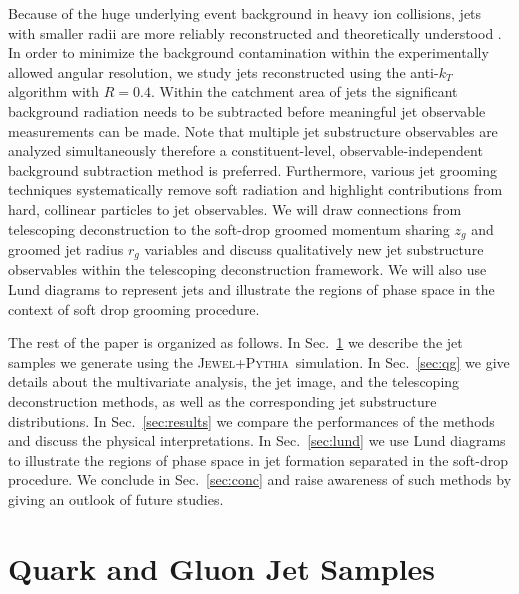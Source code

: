 \documentclass[notoc]{JHEP3}
\newcommand{\jwpy}{\textsc{Jewel+Pythia}~}
\begin{document}
Because of the huge underlying event background in heavy ion collisions, jets with smaller radii are more reliably reconstructed and theoretically understood \cite{Dasgupta:2014yra,Chien:2015cka,Becher:2015hka,Kang:2016mcy}. In order to minimize the background contamination within the experimentally allowed angular resolution, we study jets reconstructed using the anti-$k_T$ algorithm \cite{Cacciari:2008gp} with $R=0.4$. Within the catchment area of jets the significant background radiation needs to be subtracted before meaningful jet observable measurements can be made. Note that multiple jet substructure observables are analyzed simultaneously therefore a constituent-level, observable-independent background subtraction method \cite{Soyez:2012hv,Cacciari:2014gra,Berta:2014eza,Bertolini:2014bba,Komiske:2017ubm} is preferred. Furthermore, various jet grooming techniques \cite{Ellis:2009su,Ellis:2009me,Krohn:2009th,Dasgupta:2013ihk,Larkoski:2014wba} systematically remove soft radiation and highlight contributions from hard, collinear particles to jet observables. We will draw connections from telescoping deconstruction to the soft-drop groomed momentum sharing $z_g$ and groomed jet radius $r_g$ variables \cite{Larkoski:2014wba} and discuss qualitatively new jet substructure observables within the telescoping deconstruction framework. We will also use Lund diagrams \cite{Andersson1989,Salam:2016yht} to represent jets and illustrate the regions of phase space in the context of soft drop grooming procedure.

The rest of the paper is organized as follows. In Sec.~\ref{sec:sample} we describe the jet samples we generate using the \jwpy simulation. In Sec.~\ref{sec:qg} we give details about the multivariate analysis, the jet image, and the telescoping deconstruction methods, as well as the corresponding jet substructure distributions. In Sec.~\ref{sec:results} we compare the performances of the methods and discuss the physical interpretations. In Sec.~\ref{sec:lund} we use Lund diagrams to illustrate the regions of phase space in jet formation separated in the soft-drop procedure. We conclude in Sec.~\ref{sec:conc} and raise awareness of such methods by giving an outlook of future studies.



\section{Quark and Gluon Jet Samples}
\label{sec:sample}
\end{document}
